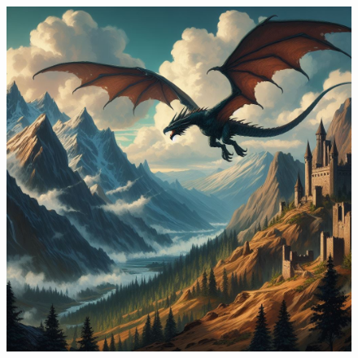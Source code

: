 \begin{figure}[h]
\begin{center}
\includegraphics[scale=0.30]{img/ai-images/wyvern.jpeg}
\end{center}
\end{figure}
